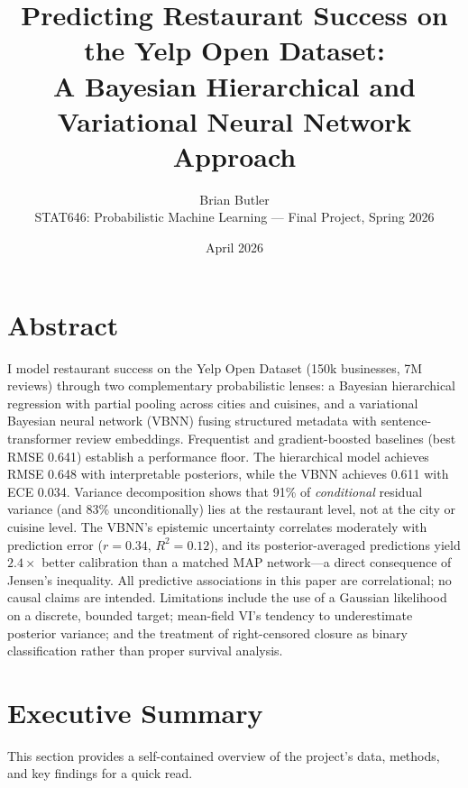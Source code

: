 \documentclass[10pt, letterpaper]{article}
\title{\vspace{-2.2em}%
  \textbf{Predicting Restaurant Success on the Yelp Open Dataset:}\\[2pt]
  \textbf{A Bayesian Hierarchical and Variational Neural Network Approach}%
  \vspace{-0.4em}}
\author{Brian Butler\\[2pt]
  \small STAT646: Probabilistic Machine Learning --- Final Project, Spring 2026}
\date{April 2026}
\begin{document}
\maketitle
\vspace{-1em}

\section*{Abstract}

I model restaurant success on the Yelp Open Dataset (150k businesses, 7M reviews) through two complementary probabilistic lenses: a Bayesian hierarchical regression with partial pooling across cities and cuisines, and a variational Bayesian neural network (VBNN) fusing structured metadata with sentence-transformer review embeddings. Frequentist and gradient-boosted baselines (best RMSE 0.641) establish a performance floor. The hierarchical model achieves RMSE 0.648 with interpretable posteriors, while the VBNN achieves 0.611 with ECE 0.034. Variance decomposition shows that 91\% of \emph{conditional} residual variance (and 83\% unconditionally) lies at the restaurant level, not at the city or cuisine level. The VBNN's epistemic uncertainty correlates moderately with prediction error ($r{=}0.34$, $R^2{=}0.12$), and its posterior-averaged predictions yield $2.4{\times}$ better calibration than a matched MAP network---a direct consequence of Jensen's inequality. All predictive associations in this paper are correlational; no causal claims are intended. Limitations include the use of a Gaussian likelihood on a discrete, bounded target; mean-field VI's tendency to underestimate posterior variance; and the treatment of right-censored closure as binary classification rather than proper survival analysis.

\section*{Executive Summary}

This section provides a self-contained overview of the project's data, methods, and key findings for a quick read.
\end{document}
